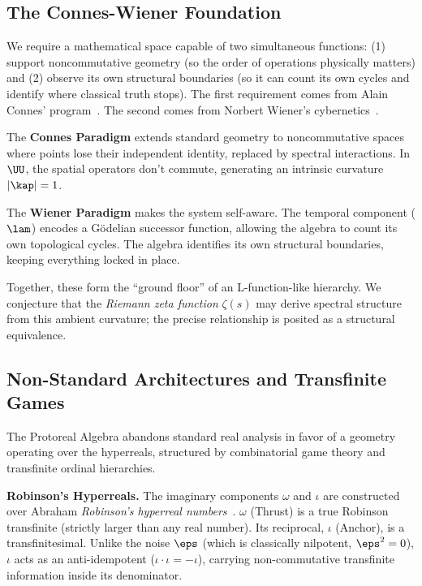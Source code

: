 \subsection{The Connes-Wiener Foundation}\label{sec:connes-wiener}

We require a mathematical space capable of two simultaneous functions: (1) support noncommutative geometry (so the order of operations physically matters) and (2) observe its own structural boundaries (so it can count its own cycles and identify where classical truth stops). The first requirement comes from Alain Connes' program~\cite{connes}. The second comes from Norbert Wiener's cybernetics~\cite{wiener}.

The \textbf{Connes Paradigm} extends standard geometry to noncommutative spaces where points lose their independent identity, replaced by spectral interactions. In $\UU$, the spatial operators don't commute, generating an intrinsic curvature $|\kap| = 1$.

The \textbf{Wiener Paradigm} makes the system self-aware. The temporal component ($\lam$) encodes a G\"odelian successor function, allowing the algebra to count its own topological cycles. The algebra identifies its own structural boundaries, keeping everything locked in place.

Together, these form the ``ground floor'' of an L-function-like hierarchy. We conjecture that the \emph{Riemann zeta function} $\zeta(s)$ may derive spectral structure from this ambient curvature; the precise relationship is posited as a structural equivalence.

\subsection{Non-Standard Architectures and Transfinite Games}

The Protoreal Algebra abandons standard real analysis in favor of a geometry operating over the hyperreals, structured by combinatorial game theory and transfinite ordinal hierarchies.

\textbf{Robinson's Hyperreals.} The imaginary components $\omega$ and $\iota$ are constructed over Abraham \emph{Robinson's hyperreal numbers}~\cite{robinson}. $\omega$ (Thrust) is a true Robinson transfinite (strictly larger than any real number). Its reciprocal, $\iota$ (Anchor), is a transfinitesimal. Unlike the noise $\eps$ (which is classically nilpotent, $\eps^2 = 0$), $\iota$ acts as an anti-idempotent ($\iota \cdot \iota = -\iota$), carrying non-commutative transfinite information inside its denominator.

